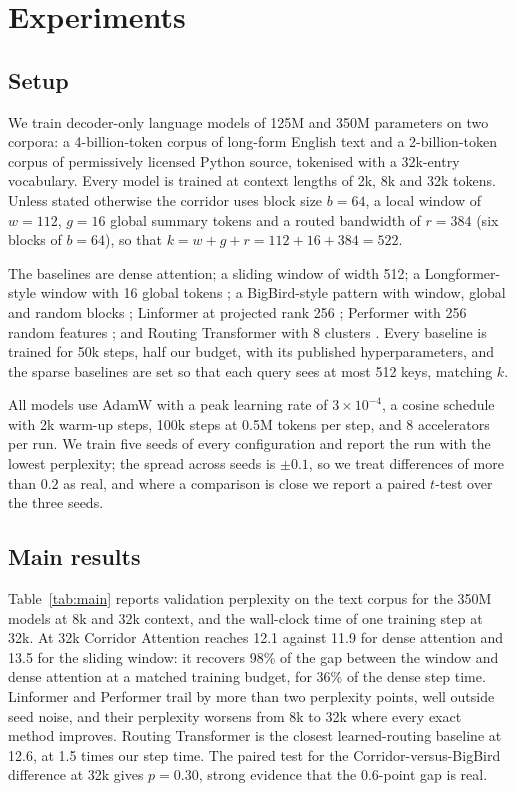 \section{Experiments}\label{sec:experiments}

\subsection{Setup}\label{sec:setup}

We train decoder-only language models of 125M and 350M parameters on two
corpora: a 4-billion-token corpus of long-form English text and a
2-billion-token corpus of permissively licensed Python source, tokenised
with a 32k-entry vocabulary. Every model is trained at context lengths of
2k, 8k and 32k tokens. Unless stated otherwise the corridor uses block size
$b = 64$, a local window of $w = 112$, $g = 16$ global summary tokens and a
routed bandwidth of $r = 384$ (six blocks of $b = 64$), so that
$k = w + g + r = 112 + 16 + 384 = 522$.

The baselines are dense attention; a sliding window of width 512; a
Longformer-style window with 16 global tokens \citep{beltagy2020longformer};
a BigBird-style pattern with window, global and random blocks
\citep{zaheer2020bigbird}; Linformer at projected rank 256
\citep{wang2020linformer}; Performer with 256 random features
\citep{choromanski2021performer}; and Routing Transformer with 8 clusters
\citep{roy2021efficient}. Every baseline is trained for 50k steps, half our
budget, with its published hyperparameters, and the sparse baselines are set
so that each query sees at most 512 keys, matching $k$.

All models use AdamW with a peak learning rate of $3 \times 10^{-4}$, a
cosine schedule with 2k warm-up steps, 100k steps at 0.5M tokens per step,
and 8 accelerators per run. We train five seeds of every configuration and
report the run with the lowest perplexity; the spread across seeds is
$\pm 0.1$, so we treat differences of more than $0.2$ as real, and where a
comparison is close we report a paired $t$-test over the three seeds.

\subsection{Main results}\label{sec:main}

Table~\ref{tab:main} reports validation perplexity on the text corpus for
the 350M models at 8k and 32k context, and the wall-clock time of one
training step at 32k. At 32k Corridor Attention reaches 12.1 against 11.9
for dense attention and 13.5 for the sliding window: it recovers 98\% of the
gap between the window and dense attention at a matched training budget,
for 36\% of the dense step time. Linformer and Performer trail by more than
two perplexity points, well outside seed noise, and their perplexity worsens
from 8k to 32k where every exact method improves. Routing Transformer is the
closest learned-routing baseline at 12.6, at 1.5 times our step time. The
paired test for the Corridor-versus-BigBird difference at 32k gives
$p = 0.30$, strong evidence that the 0.6-point gap is real.

